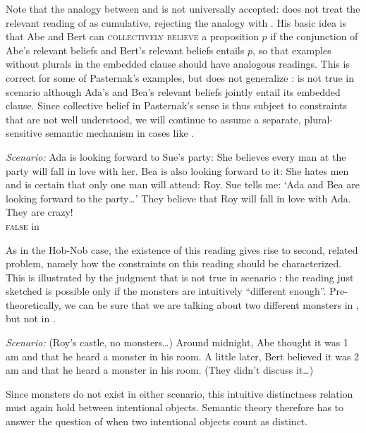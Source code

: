 \documentclass[output=paper]{langscibook}
\begin{document}
\noindent Note that the analogy between  and  is not universally accepted: \citet{Pasternak:2018a} does not treat the relevant reading of  as cumulative, rejecting the analogy with . His basic idea is that Abe and Bert can \textsc{collectively believe} a proposition $p$ if the conjunction of Abe's relevant beliefs and Bert's relevant beliefs entails $p$, so that examples without plurals in the embedded clause should have analogous readings. This is correct for some of Pasternak's examples, but does not generalize \citep{Marty:2019, Schmitt:2019a}:  is not true in scenario  although Ada's and Bea's relevant beliefs jointly entail its embedded clause. Since collective belief in Pasternak's sense is thus subject to constraints that are not well understood, we will continue to assume a separate, plural-sensitive semantic mechanism in cases like .

\eanoraggedright
\eanoraggedright \label{sch-has:ex:fn1} \textit{Scenario:} Ada is looking forward to Sue's party: She believes every man at the party will fall in love with her. Bea is also looking forward to it: She hates men and is certain that only one man will attend: Roy. Sue tells me: `Ada and Bea are looking forward to the party\ldots'
\ex \label{sch-has:ex:fn2} They believe that Roy will fall in love with Ada. They are crazy! \\
\null \hfill \textsc{false} in 
\z\z

\noindent As in the Hob-Nob case, the existence of this reading gives rise to second, related problem, namely how the constraints on this reading should be characterized. This is illustrated by the judgment that  is not true in scenario : the reading just sketched is possible only if the monsters are intuitively ``different enough''. Pre-theoretically, we can be sure that we are talking about two different monsters in , but not in . 

\eanoraggedright\label{sch-has:ex:8} \textit{Scenario:}   (Roy's castle, no monsters\ldots) Around midnight, Abe thought it was 1 am and that he heard a monster in his room. A little later, Bert believed it was 2 am and that he heard a monster in his room. (They didn't discuss it\ldots) \z

\noindent Since monsters do not exist in either scenario, this intuitive distinctness relation must again hold between intentional objects.  Semantic theory therefore has to answer the question of when two intentional objects count as distinct.
\end{document}

